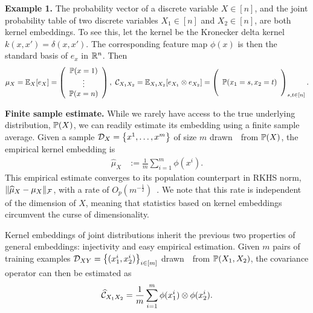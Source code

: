 \documentclass{article}
\newcommand{\hmu}{\widehat{\mu}}
\begin{document}
{\bf Example 1.} The probability vector of a discrete variable $X \in [n]$, and the joint probability table of two discrete variables $X_1 \in [n]$ and $X_2 \in [n]$, are both kernel embeddings. To see this, let the kernel be the Kronecker delta kernel $k(x,x') = \delta(x,x')$. The corresponding feature map $\phi(x)$ is then the standard basis of $e_{x}$ in $\mathbb{R}^n$. Then
\begin{align}
    \mu_X
		= \mathbb{E}_X[e_X] = \left(
      \begin{array}{c}
         \mathbb{P}(x = 1) \cr
         \vdots \cr
         \mathbb{P}(x = n)
       \end{array}
    \right),~
		\mathcal{C}_{X_1X_2}
		= \mathbb{E}_{X_1X_2}[e_{X_1} \otimes e_{X_2}]=
		\left(
        \begin{array}{c}
            \cr
            \mathbb{P}(x_1=s,x_2=t) \cr
						\cr
        \end{array}
    \right)_{s,t \in [n]}. \label{eq:jointprobabilitytable}
\end{align}

{\bf Finite sample estimate.} While we rarely have access to the true underlying distribution, $\mathbb{P}(X)$,
we can readily estimate its embedding using a finite sample average. Given a sample $\mathcal{D}_{X} = \left\{x^1, \ldots, x^m\right\}$ of size $m$ drawn~\iid~from $\mathbb{P}(X)$, the empirical kernel embedding is
\begin{align}
    \hmu_{X} &:= \frac{1}{m} \sum\nolimits_{i=1}^m \phi(x^i). \label{eq:empirical_embedding}
\end{align}
This empirical estimate converges to its population counterpart in RKHS norm, $\|\hmu_X - \mu_X \|_{\Fcal}$, with a rate of $O_p(m^{-\frac{1}{2}})$~\cite{SmoGreSonSch07}. We note that this rate is independent of the dimension of $X$, meaning that statistics based on kernel embeddings circumvent the curse of dimensionality.

Kernel embeddings of joint distributions inherit the previous two properties of general embeddings: injectivity and easy empirical estimation. Given $m$ pairs of training examples $\mathcal{D}_{XY}=\left\{(x_1^i,x_2^i)\right\}_{i\in [m]}$ drawn~\iid~from $\mathbb{P}(X_1,X_2)$,
the covariance operator can then be estimated as
\begin{align}
 \widehat {\mathcal{C}}_{X_1X_2} =\frac{1}{m}\sum_{i=1}^m \phi(x_1^i) \otimes \phi(x_2^i). \label{eq:empirical_covariance}
\end{align}
\end{document}
